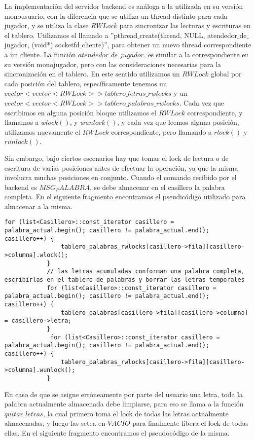 La implementación del servidor backend es análoga a la utilizada en su versión monousuario, con la diferencia que se utiliza un thread distinto para cada jugador, y se utiliza la clase $RWLock$ para sincronizar las lecturas y escrituras en el tablero. Utilizamos el llamado a ''pthread$\_$create(thread, NULL, atendedor$\_$de$\_$jugador, (void*) socketfd$\_$cliente)'', para obtener un nuevo thread correspondiente a un cliente. La función $atendedor\_de\_jugador$, es similar a la correspondiente en su versión monojugador, pero con las consideraciones necesarias para la sincronización en el tablero. En este sentido utilizamos un $RWLock$ global por cada posición del tablero, específicamente tenemos un $ vector<vector<RWLock> > tablero\_letras\_rwlocks$ y un $vector<vector<RWLock> > tablero\_palabras\_rwlocks $. Cada vez que escribimos en alguna posición bloque utilizamos el $RWLock$ correspondiente, y llamamos a $ wlock() $, y $ wunlock() $, y cada vez que leemos alguna posición, utilizamos nuevamente el $RWLock$ correspondiente, pero llamando a $ rlock() $ y $ runlock() $.

Sin embargo, bajo ciertos escenarios hay que tomar el lock de lectura o de escritura de varias posiciones antes de efectuar la operación, ya que la misma involucra muchas posiciones en conjunto. Cuando el comando recibido por el backend es $MSG_PALABRA$, se debe almacenar en el casillero la palabra completa. En el siguiente fragmento encontramos el pseudicódigo utilizado para almacenar a la misma. 

 
\begin{lstlisting}
for (list<Casillero>::const_iterator casillero = palabra_actual.begin(); casillero != palabra_actual.end(); casillero++) {
                tablero_palabras_rwlocks[casillero->fila][casillero->columna].wlock();
            }
            // las letras acumuladas conforman una palabra completa, escribirlas en el tablero de palabras y borrar las letras temporales
            for (list<Casillero>::const_iterator casillero = palabra_actual.begin(); casillero != palabra_actual.end(); casillero++) {
                tablero_palabras[casillero->fila][casillero->columna] = casillero->letra;
            }
             for (list<Casillero>::const_iterator casillero = palabra_actual.begin(); casillero != palabra_actual.end(); casillero++) {
                tablero_palabras_rwlocks[casillero->fila][casillero->columna].wunlock();
            }
\end{lstlisting}

En caso de que se asigne erróneamente por parte del usuario una letra, toda la palabra actualmente almacenada debe limpiarse, para eso se llama a la función $ quitar\_letras $, la cual primero toma el lock de todas las letras actualmente almacenadas, y luego las setea en $VACIO$ para finalmente libera el lock de todas ellas.
En el siguiente fragmento encontramos el pseudocódigo de la misma.

